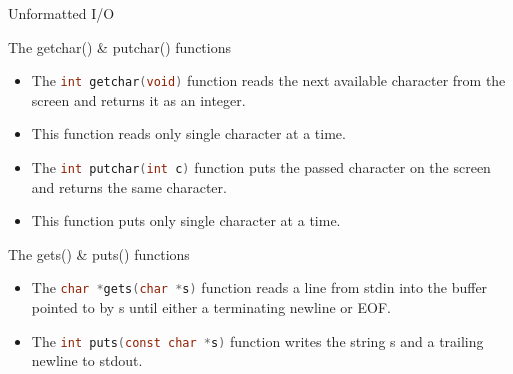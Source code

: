 \documentclass[10pt,t]{beamer}
\begin{document}
\begin{frame}[fragile]{Unformatted I/O}
  \begin{block}{The getchar() \& putchar() functions}
    \begin{itemize}
      \item The \lstinline[language=C,basicstyle=\scriptsize\ttfamily]|int getchar(void)| function reads the next available character from the screen and returns it as an integer. 
      \item[] This function reads only single character at a time.
      \item The \lstinline[language=C,basicstyle=\scriptsize\ttfamily]|int putchar(int c)| function puts the passed character on the screen and returns the same character. 
      \item[] This function puts only single character at a time. 
    \end{itemize}
  \end{block}

  \begin{block}{The gets() \& puts() functions}
    \begin{itemize}
      \item The \lstinline[language=C,basicstyle=\scriptsize\ttfamily]|char *gets(char *s)| function reads a line from stdin into the buffer pointed to by s until either a terminating newline or EOF.
      \item The \lstinline[language=C,basicstyle=\scriptsize\ttfamily]|int puts(const char *s)| function writes the string s and a trailing newline to stdout.
    \end{itemize}
  \end{block}
\end{frame}

\begin{frame}[fragile]
  \begin{columns}
    
    
  \end{columns}
\end{frame}
\end{document}

